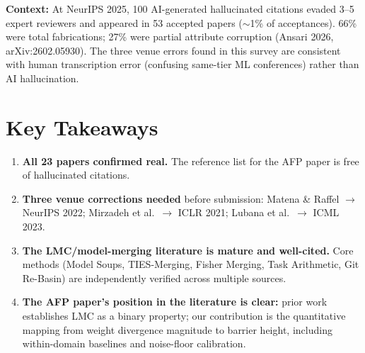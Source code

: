 \documentclass[11pt,a4paper]{article}
\begin{document}
\textbf{Context:} At NeurIPS 2025, 100 AI-generated hallucinated citations evaded 3--5 expert reviewers and appeared in 53 accepted papers ($\sim$1\% of acceptances). 66\% were total fabrications; 27\% were partial attribute corruption (Ansari 2026, arXiv:2602.05930). The three venue errors found in this survey are consistent with human transcription error (confusing same-tier ML conferences) rather than AI hallucination.

\section{Key Takeaways}

\begin{enumerate}[leftmargin=*]
    \item \textbf{All 23 papers confirmed real.} The reference list for the AFP paper is free of hallucinated citations.
    \item \textbf{Three venue corrections needed} before submission: Matena \& Raffel $\rightarrow$ NeurIPS 2022; Mirzadeh et al.\ $\rightarrow$ ICLR 2021; Lubana et al.\ $\rightarrow$ ICML 2023.
    \item \textbf{The LMC/model-merging literature is mature and well-cited.} Core methods (Model Soups, TIES-Merging, Fisher Merging, Task Arithmetic, Git Re-Basin) are independently verified across multiple sources.
    \item \textbf{The AFP paper's position in the literature is clear:} prior work establishes LMC as a binary property; our contribution is the quantitative mapping from weight divergence magnitude to barrier height, including within-domain baselines and noise-floor calibration.
\end{enumerate}
\end{document}
